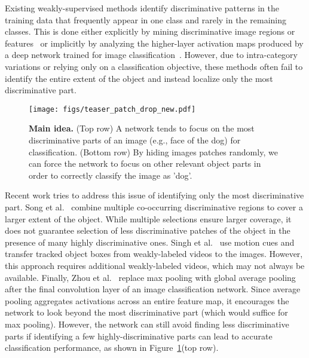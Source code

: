 \documentclass[10pt,twocolumn,letterpaper]{article}
\begin{document}
Existing weakly-supervised methods identify discriminative patterns in the training data that frequently appear in one class and rarely in the remaining classes.  This is done either explicitly by mining discriminative image regions or features~\cite{weber-eccv2000,fergus-cvpr2003,Crandall-ECCV2006,siva-eccv2012,bilen-bmcv2014,song-icml2014,song-nips2014,cinbis-arxiv2015,krishna-cvpr2016} or implicitly by analyzing the higher-layer activation maps produced by a deep network trained for image classification~\cite{simonyan-iclr2014,Oquab-cvpr15,zhou-cvpr2016}.  However, due to intra-category variations or relying only on a classification objective, these methods often fail to identify the entire extent of the object and instead localize only the most discriminative part.

\begin{figure}[t!]
\centering
    \texttt{[image: figs/teaser\_patch\_drop\_new.pdf]}
    \caption{\textbf{Main idea.}  (Top row) A network tends to focus on the most discriminative parts of an image (e.g., face of the dog) for classification. (Bottom row) By hiding images patches randomly, we can force the network to focus on other relevant object parts in order to correctly classify the image as 'dog'.}
    \label{fig:teaser}
    \vspace*{-0.1in}
\end{figure}

Recent work tries to address this issue of identifying only the most discriminative part.  Song et al.~\cite{song-nips2014} combine multiple co-occurring discriminative regions to cover a larger extent of the object.  While multiple selections ensure larger coverage, it does not guarantee selection of less discriminative patches of the object in the presence of many highly discriminative ones.  Singh et al.~\cite{krishna-cvpr2016} use motion cues and transfer tracked object boxes from weakly-labeled videos to the images.  However, this approach requires additional weakly-labeled videos, which may not always be available.  Finally, Zhou et al.~\cite{zhou-cvpr2016} replace max pooling with global average pooling after the final convolution layer of an image classification network.  Since average pooling aggregates activations across an entire feature map, it encourages the network to look beyond the most discriminative part (which would suffice for max pooling).  However, the network can still avoid finding less discriminative parts if identifying a few highly-discriminative parts can lead to accurate classification performance, as shown in Figure~\ref{fig:teaser}(top row).
\end{document}
